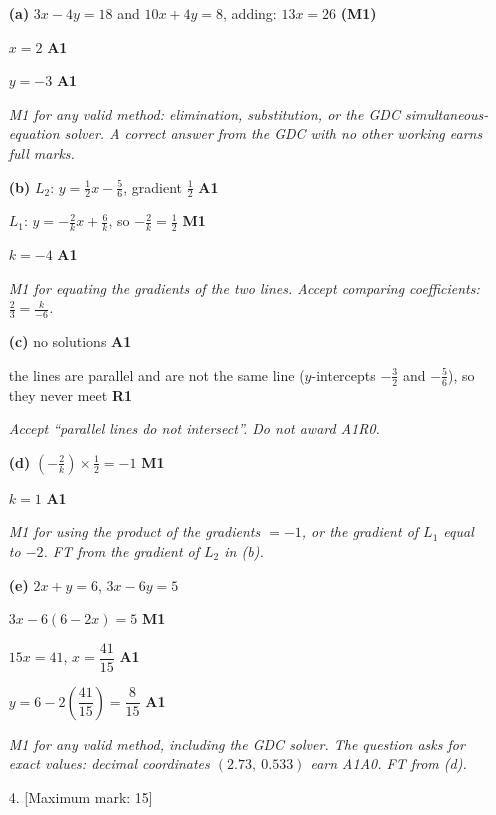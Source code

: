 \documentclass[12pt, twoside]{article}
\begin{document}
\begin{enumerate}[itemsep=0.3cm]
\textbf{(a)} $3x - 4y = 18$ and $10x + 4y = 8$, adding: $13x = 26$ \hfill \textbf{(M1)}

$x = 2$ \hfill \textbf{A1}

$y = -3$ \hfill \textbf{A1}

\emph{M1 for any valid method: elimination, substitution, or the GDC
simultaneous-equation solver. A correct answer from the GDC with no other
working earns full marks.}

\textbf{(b)} $L_{2}$: $y = \frac{1}{2}x - \frac{5}{6}$, gradient $\frac{1}{2}$ \hfill \textbf{A1}

$L_{1}$: $y = -\frac{2}{k}x + \frac{6}{k}$, so $-\frac{2}{k} = \frac{1}{2}$ \hfill \textbf{M1}

$k = -4$ \hfill \textbf{A1}

\emph{M1 for equating the gradients of the two lines. Accept comparing
coefficients: $\frac{2}{3} = \frac{k}{-6}$.}

\textbf{(c)} no solutions \hfill \textbf{A1}

the lines are parallel and are not the same line ($y$-intercepts
$-\frac{3}{2}$ and $-\frac{5}{6}$), so they never meet \hfill \textbf{R1}

\emph{Accept ``parallel lines do not intersect''. Do not award A1R0.}

\textbf{(d)} $\left(-\frac{2}{k}\right) \times \frac{1}{2} = -1$ \hfill \textbf{M1}

$k = 1$ \hfill \textbf{A1}

\emph{M1 for using the product of the gradients $= -1$, or the gradient of
$L_{1}$ equal to $-2$. FT from the gradient of $L_{2}$ in (b).}

\textbf{(e)} $2x + y = 6$, \quad $3x - 6y = 5$

$3x - 6(6 - 2x) = 5$ \hfill \textbf{M1}

$15x = 41$, \quad $x = \dfrac{41}{15}$ \hfill \textbf{A1}

$y = 6 - 2\left(\dfrac{41}{15}\right) = \dfrac{8}{15}$ \hfill \textbf{A1}

\emph{M1 for any valid method, including the GDC solver. The question asks
for exact values: decimal coordinates $(2.73,\ 0.533)$ earn A1A0. FT from
(d).}

\newpage

\item[4.] [Maximum mark: 15]


\end{enumerate}
\end{document}
